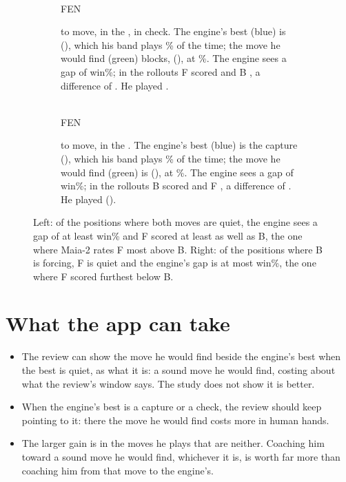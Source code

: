 \documentclass[11pt]{article}
\begin{document}
\begin{figure}[ht]
\centering
\begin{subfigure}[t]{0.48\textwidth}
\centering
\ExBoard\\[0.4em]
{\footnotesize FEN \ExFen}
\caption{\ExSide{} to move, \ExKind{} in the \ExPhase, in check. The engine's best (blue) is
\ExBest{} (\ExBestUci), which his band plays \ExPBest\% of the time; the move he would find
(green) blocks, \ExFind{} (\ExFindUci), at \ExPFind\%. The engine sees a gap of \ExGap{} win\%;
in the rollouts F scored \ExVFind{} and B \ExVBest, a difference of \ExDF. He played
\ExPlayed.}
\label{fig:held}
\end{subfigure}\hfill
\begin{subfigure}[t]{0.48\textwidth}
\centering
\EyBoard\\[0.4em]
{\footnotesize FEN \EyFen}
\caption{\EySide{} to move, \EyKind{} in the \EyPhase. The engine's best (blue) is the capture
\EyBest{} (\EyBestUci), which his band plays \EyPBest\% of the time; the move he would find
(green) is \EyFind{} (\EyFindUci), at \EyPFind\%. The engine sees a gap of \EyGap{} win\%; in
the rollouts B scored \EyVBest{} and F \EyVFind, a difference of \EyDF. He played \EyPlayed{}
(\EyPlayedUci).}
\label{fig:cost}
\end{subfigure}
\caption{Left: of the positions where both moves are quiet, the engine sees a gap of at least
\QuietGap{} win\% and F scored at least as well as B, the one where Maia-2 rates F most above B.
Right: of the positions where B is forcing, F is quiet and the engine's gap is at most
\ForcingGap{} win\%, the one where F scored furthest below B.}
\label{fig:examples}
\end{figure}

\section{What the app can take}

\begin{itemize}[nosep]
\item The review can show the move he would find beside the engine's best when the best is quiet,
  as what it is: a sound move he would find, costing about what the review's window says. The
  study does not show it is better.
\item When the engine's best is a capture or a check, the review should keep pointing to it:
  there the move he would find costs more in human hands.
\item The larger gain is in the moves he plays that are neither. Coaching him toward a sound move
  he would find, whichever it is, is worth far more than coaching him from that move to the
  engine's.
\end{itemize}
\end{document}
